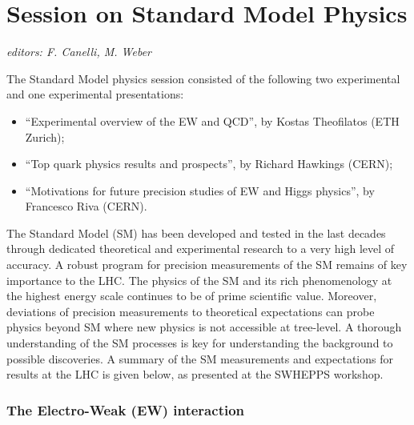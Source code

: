 \section{Session on Standard Model Physics}\label{standardmodel}{\it editors: F. Canelli, M. Weber}

\noindent The Standard Model physics session  consisted of the following two experimental and one experimental presentations:
\begin{itemize} \setlength{\itemsep}{-1ex}
\item ``Experimental overview of the EW and QCD'', by Kostas Theofilatos  (ETH Zurich);
\item ``Top quark physics results and prospects'', by Richard Hawkings (CERN);
\item ``Motivations for future precision studies of EW and Higgs physics'', by Francesco Riva (CERN).
\end{itemize}

\noindent The Standard Model (SM) has been developed and tested in the last decades 
through dedicated theoretical and experimental research to a very high level of accuracy.
A robust program for precision measurements of the SM remains of key
importance to the LHC. The physics of the SM and its rich phenomenology
at the highest energy scale continues to be of prime scientific value.
Moreover, deviations of precision measurements to theoretical
expectations can probe physics beyond SM where new physics is not
accessible at tree-level. A thorough understanding of the SM processes
is key for understanding the background to possible discoveries. A
summary of the SM measurements and expectations for results at the LHC
is given below, as presented at the SWHEPPS workshop.

\subsubsection*{The Electro-Weak (EW) interaction}

